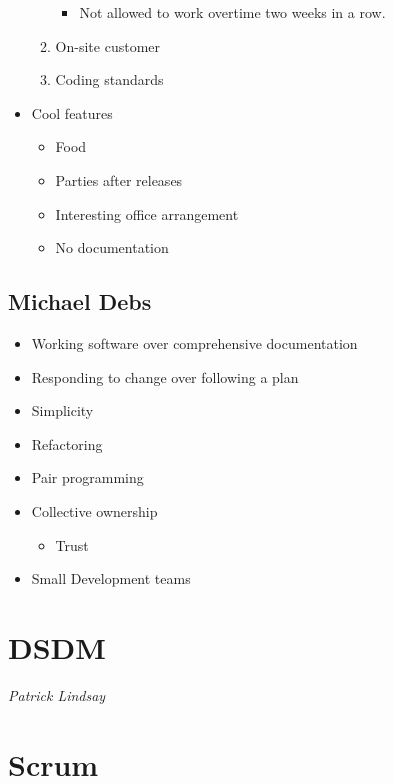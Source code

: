 \documentclass{report}
\begin{document}
\begin{itemize}
\begin{enumerate}
\begin{itemize}
									\item Not allowed to work overtime two weeks in a row.
								\end{itemize}
							\item On-site customer
							\item Coding standards
						\end{enumerate}
					\item Cool features
						\begin{itemize}
							\item Food
							\item Parties after releases
							\item Interesting office arrangement
							\item No documentation
						\end{itemize}
				\end{itemize}
			\subsection{Michael Debs}
				\begin{itemize}
					\item Working software over comprehensive documentation
					\item Responding to change over following a plan
					\item Simplicity
					\item Refactoring
					\item Pair programming
					\item Collective ownership
						\begin{itemize}
							\item Trust
						\end{itemize}
					\item Small Development teams
				\end{itemize}
		\section{DSDM}
			\textit{Patrick Lindsay}
		\section{Scrum}
\end{document}
